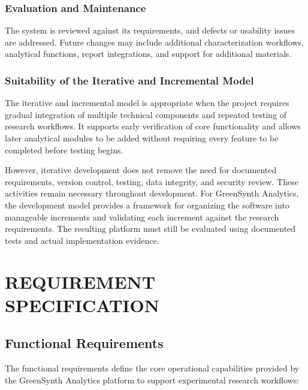 \documentclass[12pt,a4paper,oneside]{report}
\begin{document}
{{{\subsection{Evaluation and Maintenance}
The system is reviewed against its requirements, and defects or usability issues are addressed. Future changes may include additional characterization workflows, analytical functions, report integrations, and support for additional materials.

\subsection{Suitability of the Iterative and Incremental Model}
The iterative and incremental model is appropriate when the project requires gradual integration of multiple technical components and repeated testing of research workflows. It supports early verification of core functionality and allows later analytical modules to be added without requiring every feature to be completed before testing begins.

However, iterative development does not remove the need for documented requirements, version control, testing, data integrity, and security review. These activities remain necessary throughout development. For GreenSynth Analytics, the development model provides a framework for organizing the software into manageable increments and validating each increment against the research requirements. The resulting platform must still be evaluated using documented tests and actual implementation evidence. 


\chapter{REQUIREMENT SPECIFICATION}

\section{Functional Requirements}

The functional requirements define the core operational capabilities provided by the GreenSynth Analytics platform to support experimental research workflows:

}}}
\end{document}
